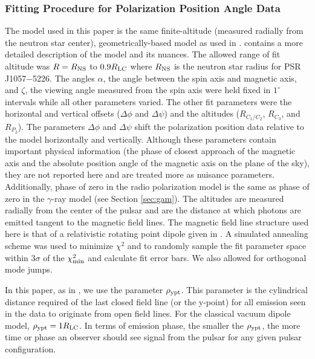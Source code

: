 \subsubsection{Fitting Procedure for Polarization Position Angle Data}
\label{sec:fitProcedure}
The model used in this paper is the same finite-altitude (measured radially from the neutron star center),
geometrically-based model as used in \cite{craig2014tackling}.
\cite{craig2014tackling} contains a more detailed description
of the model and its nuances.
The allowed range of fit altitude was  $R=R_{\rm{NS}}$ to $0.9R_{\rm{LC}}$
where $R_{\rm{NS}}$ is the neutron star radius for PSR J1057$-$5226.
The angles $\alpha$, the angle between the spin axis and
magnetic axis, and $\zeta$, the viewing angle measured from 
the spin axis were held fixed in $1^\circ$ intervals while 
all other parameters varied.  The other fit parameters
were the horizontal and vertical offsets ($\Delta \phi$ 
and $\Delta \psi$) and the altitudes ($R_{C_1/C_2}$, $R_{C_3}$, and $R_{P_2}$).
The parameters $\Delta \phi$ and $\Delta \psi$
shift the polarization position data relative to the model horizontally
and vertically.
Although these parameters contain important physical information
(the phase of closest approach of the magnetic axis and 
the absolute position angle of the magnetic axis on the
plane of the sky), they are not reported here and are treated more as 
nuisance parameters.
Additionally, phase of zero in the radio polarization
model is the same as phase of zero in the $\gamma$-ray model
(see Section \ref{sec:gam}).
The altitudes are measured radially from the center of the pulsar and
are the distance at which photons are emitted tangent to the magnetic 
field lines.  The magnetic field line structure used here is 
that of a relativistic rotating point dipole given in \cite{kaburaki1980determination}.
A simulated annealing scheme was used to minimize
$\chi^2$ \citep{flannery1992numerical} and to randomly sample
the fit parameter space within $3\sigma$  of the $\chi^2_{\rm{min}}$
and calculate fit error bars.  We also
allowed for orthogonal mode jumps.

In this paper, as in \cite{craig2014tackling}, we use the parameter
$\rho_{\rm{ypt}}$.  This parameter is the cylindrical distance
required of the last closed field line (or the y-point)
for all emission seen in the data to originate from
open field lines. For the classical vacuum dipole 
model, $\rho_{\rm{ypt}}=1R_{\rm{LC}}$.  In terms of emission
phase, the smaller the $\rho_{\rm{ypt}}$, the more
time or phase an observer should see signal from the
pulsar for any given pulsar configuration.


